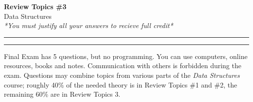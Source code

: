\documentclass[a4paper,12pt]{article}
\begin{document}
\begin{center}
{\bf\Huge Review Topics \#3} \\[5pt]
Data Structures \\
\textit{*You must justify all your answers to recieve full credit*}
\end{center}

\hrule
\vspace{2pt}
\hrule
\vspace{12pt}

{\footnotesize
Final Exam has 5 questions, but no programming. You can use computers, 
online resources, books and notes. Communication with others is forbidden during the exam.
Questions may combine topics from various parts of the {\em Data Structures} course;
roughly 40\% of the needed theory is in Review Topics \#1 and \#2, 
the remaining 60\% are in Review Topics 3.

}
\end{document}
